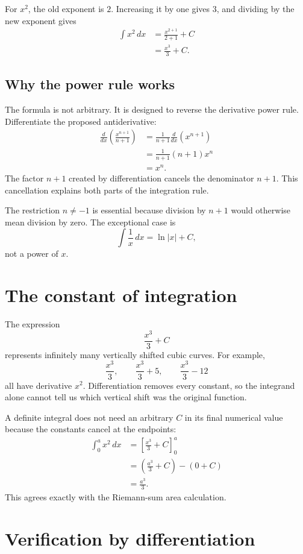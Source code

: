 \documentclass[11pt]{article}
\begin{document}
For $x^2$, the old exponent is $2$. Increasing it by one gives $3$, and dividing by the new exponent gives
\begin{align*}
\int x^2\,dx
&=\frac{x^{2+1}}{2+1}+C\\
&=\boxed{\frac{x^3}{3}+C}.
\end{align*}

\subsection{Why the power rule works}

The formula is not arbitrary. It is designed to reverse the derivative power rule. Differentiate the proposed antiderivative:
\begin{align*}
\frac{d}{dx}\left(\frac{x^{n+1}}{n+1}\right)
&=\frac{1}{n+1}\frac{d}{dx}\left(x^{n+1}\right)\\
&=\frac{1}{n+1}(n+1)x^n\\
&=x^n.
\end{align*}
The factor $n+1$ created by differentiation cancels the denominator $n+1$. This cancellation explains both parts of the integration rule.

The restriction $n\ne -1$ is essential because division by $n+1$ would otherwise mean division by zero. The exceptional case is
\[
\int \frac{1}{x}\,dx=\ln|x|+C,
\]
not a power of $x$.

\section{The constant of integration}

The expression
\[
\frac{x^3}{3}+C
\]
represents infinitely many vertically shifted cubic curves. For example,
\[
\frac{x^3}{3},\qquad \frac{x^3}{3}+5,
\qquad \frac{x^3}{3}-12
\]
all have derivative $x^2$. Differentiation removes every constant, so the integrand alone cannot tell us which vertical shift was the original function.

A definite integral does not need an arbitrary $C$ in its final numerical value because the constants cancel at the endpoints:
\begin{align*}
\int_0^a x^2\,dx
&=\left[\frac{x^3}{3}+C\right]_0^a\\
&=\left(\frac{a^3}{3}+C\right)-\left(0+C\right)\\
&=\frac{a^3}{3}.
\end{align*}
This agrees exactly with the Riemann-sum area calculation.

\section{Verification by differentiation}
\end{document}
